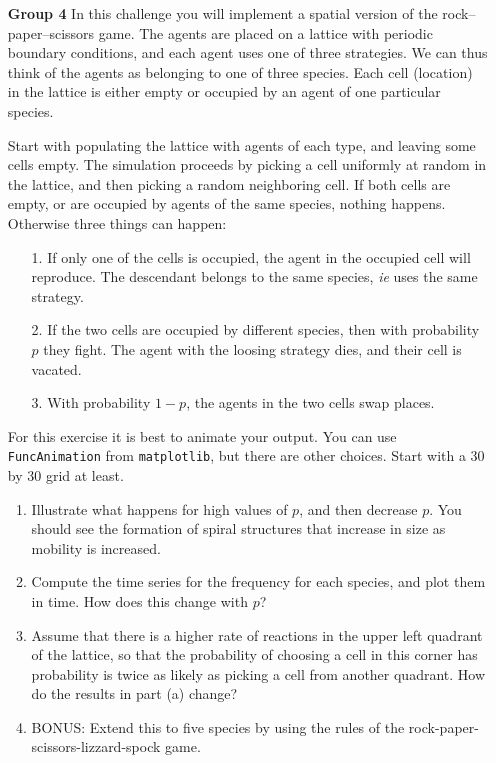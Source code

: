 \documentclass[12pt]{article}
\begin{document}
\begin{enumerate}
\item[\bf Group 4]  In this challenge you will implement a spatial version of the rock--paper--scissors game. The agents
are placed on a lattice with periodic boundary conditions, and each agent uses one of three strategies.  We can 
thus think of the agents as belonging to one of three species.  Each cell (location) in the lattice is either empty or occupied by 
an agent of one particular species.

Start with populating the lattice with agents of each type, and leaving some cells empty.
The simulation proceeds by picking a cell uniformly at random in the lattice, and then picking a random neighboring cell.
If both cells are empty, or are occupied by agents of the same species, nothing happens.  Otherwise three things can happen:
\begin{enumerate}
\item[1.] If only one of the cells is occupied, the agent in the occupied cell will reproduce.
The descendant belongs to the same species, \emph{ie} uses the same strategy.
\item[2.]  If the two cells are occupied by different species, then with probability $p$ they fight. 
The agent with the loosing strategy dies, and their cell is vacated. 
\item[3.] With probability $1-p$, the agents in the two cells swap places.
\end{enumerate}

For this exercise it is best to animate your output.  You can use \verb|FuncAnimation| from \verb|matplotlib|, but there are other choices. 
Start with a 30 by 30 grid at least.

\begin{enumerate}
\item Illustrate what happens for high values of $p$, and then decrease $p$. You should see the formation of spiral structures that increase in size as mobility is increased.
\item Compute the time series for the frequency for each species, and plot them in time.  How does this change with $p$?
\item Assume that there is a higher rate of reactions in the upper left quadrant of the lattice, so that the probability of choosing a 
cell in this corner has probability is twice as likely as picking a cell from another quadrant.  How do the results in part (a) change?
\item BONUS: Extend this to five species by using the rules of the rock-paper-scissors-lizzard-spock game.
\end{enumerate}

\end{enumerate}
\end{document}
